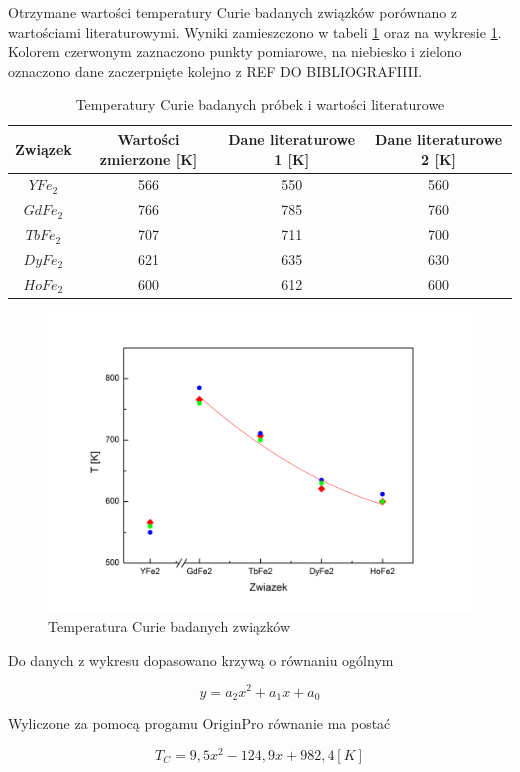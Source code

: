 \documentclass[a4paper,12pt]{article}
\numberwithin{equation}{section}
\begin{document}
Otrzymane wartości temperatury Curie badanych związków porównano z wartościami literaturowymi. Wyniki zamieszczono w tabeli \ref{tabTCurie} oraz na wykresie \ref{RysTempCurie}. Kolorem czerwonym zaznaczono punkty pomiarowe, na niebiesko i zielono oznaczono
dane zaczerpnięte kolejno 
z REF DO BIBLIOGRAFIIII. 

  \begin{table}[ht]
  \centering
  \footnotesize
  \caption{Temperatury Curie badanych próbek i wartości literaturowe}
  \label{tabTCurie}
  \begin{tabular}{|c|c|c|c|}
    \hline
Związek	&	Wartości zmierzone [K]	&	Dane literaturowe 1 [K]	&	Dane literaturowe 2 [K]	\\\hline
$YFe_2$	&	566	&	550	&	560	\\\hline
$GdFe_2$	&	766	&	785	&	760	\\\hline
$TbFe_2$	&	707	&	711	&	700	\\\hline
$DyFe_2$	&	621	&	635	&	630	\\\hline
$HoFe_2$	&	600	&	612	&	600	\\\hline  
  \end{tabular}
\end{table}

\begin{figure}[ht]
    \centering
    \includegraphics[width =1.0\textwidth]{../img/TempCurie1}
    \caption{Temperatura Curie badanych związków}
    \label{RysTempCurie}
\end{figure}

Do danych z wykresu dopasowano krzywą o równaniu ogólnym 

  \begin{equation}
   y=a_2x^2+a_1x+a_0
    \label{parabola}
  \end{equation}

Wyliczone za pomocą progamu OriginPro równanie ma postać

  \begin{equation}
   T_C=9,5x^2-124,9x+982,4 [K]
    \label{gotowaParabola}
  \end{equation}
\end{document}
